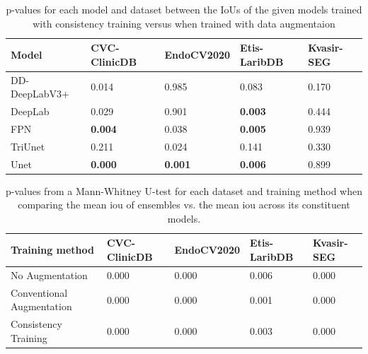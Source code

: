     \begin{table}[htb]
    \centering
    \begin{tabularx}{\linewidth}{lXXXX}
    \toprule
      Model & CVC-ClinicDB & EndoCV2020 & Etis-LaribDB & Kvasir-SEG\\
      \midrule
      DD-DeepLabV3+ & 0.014 & 0.985 & 0.083 & 0.170\\
      DeepLab       & 0.029 & 0.901 & \textbf{0.003} & 0.444\\
      FPN           & \textbf{0.004} & 0.038 & \textbf{0.005} & 0.939\\
      TriUnet       & 0.211 & 0.024 & 0.141 & 0.330\\
      Unet          & \textbf{0.000} & \textbf{0.001} & \textbf{0.006} & 0.899\\
      \bottomrule
    \end{tabularx}
    \caption[T-test results consistency training]{p-values for each model and dataset between the IoUs of the given models trained with consistency training versus when trained with data augmentaion}
    \label{tab:ttest_per_dataset_consistency}
\end{table}
    
\begin{table}[htb]
    \centering
  \begin{tabularx}{\linewidth}{lXXXX}
    \toprule
    Training method & CVC-ClinicDB & EndoCV2020 & Etis-LaribDB& Kvasir-SEG \\
    \midrule
    No Augmentation             & 0.000 & 0.000 & 0.006 & 0.000 \\ 
    Conventional Augmentation   & 0.000 & 0.000 & 0.001 & 0.000 \\ 
    Consistency Training        & 0.000 & 0.000 & 0.003 & 0.000 \\
    \bottomrule
\end{tabularx}
    \caption{p-values from a Mann-Whitney U-test for each dataset and training method when comparing the mean \gls{iou} of ensembles vs. the mean \gls{iou} across its constituent models.}
    \label{tab:ensemble_v_singular}
\end{table}


